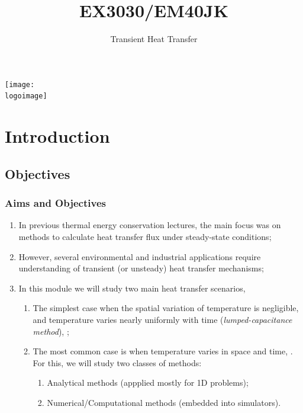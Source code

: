\documentclass[10pt,compress,unknownkeysallowed]{beamer}
\institute{School of Engineering}
\title{EX3030/EM40JK}
\subtitle{Transient Heat Transfer}
\date[ ]{ }
\newcommand{\logoimage}{../FigBanner/UoAHorizBanner}
\begin{document}
\begin{frame}
  \titlepage
  \vfill%
  \begin{center}
    \texttt{[image: \\logoimage]}
  \end{center}
\end{frame}




\section{Introduction} 


\subsection{Objectives}

\begin{frame}
 \frametitle{Aims and Objectives}
   \begin{enumerate}
     \item<1-> In previous thermal energy conservation lectures, the main focus was on methods to calculate heat transfer flux under steady-state conditions;
     \item<1-> However, several environmental and industrial applications require understanding of transient (or unsteady) heat transfer mechanisms;
     \item<2-> In this module we will study two main heat transfer scenarios,
         \begin{enumerate}
            \item<2-> The simplest case when the spatial variation of temperature is negligible, and temperature varies nearly uniformly with time ({\it lumped-capacitance method}), \ie {};
            \item<3-> The most common case is when temperature varies in space and time, \ie {}. For this, we will study two classes of methods:
              \begin{enumerate}
                 \item<4-> Analytical methods (appplied mostly for 1D problems);
                 \item<5-> Numerical/Computational methods (embedded into simulators). 
              \end{enumerate}
         \end{enumerate}
   \end{enumerate}
\end{frame}
\end{document}
